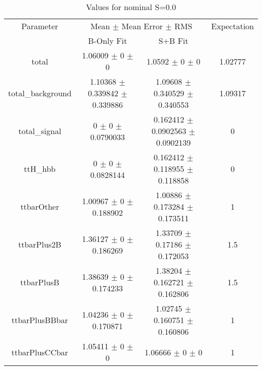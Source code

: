 \begin{table}
\centering
\caption{Values for nominal S=0.0}
\begin{tabular}{cccc}
\toprule
Parameter & \multicolumn{2}{c}{Mean $\pm$ Mean Error $\pm$ RMS} & Expectation\\
 & B-Only Fit & S+B Fit & \\
\midrule
total & \num{1.06009} $\pm$ \num{0} $\pm$ \num{0} & \num{1.0592} $\pm$ \num{0} $\pm$ \num{0} & \num{1.02777}\\
total\_background & \num{1.10368} $\pm$ \num{0.339842} $\pm$ \num{0.339886} & \num{1.09608} $\pm$ \num{0.340529} $\pm$ \num{0.340553} & \num{1.09317}\\
total\_signal & \num{0} $\pm$ \num{0} $\pm$ \num{0.0790033} & \num{0.162412} $\pm$ \num{0.0902563} $\pm$ \num{0.0902139} & \num{0}\\
ttH\_hbb & \num{0} $\pm$ \num{0} $\pm$ \num{0.0828144} & \num{0.162412} $\pm$ \num{0.118955} $\pm$ \num{0.118858} & \num{0}\\
ttbarOther & \num{1.00967} $\pm$ \num{0} $\pm$ \num{0.188902} & \num{1.00886} $\pm$ \num{0.173284} $\pm$ \num{0.173511} & \num{1}\\
ttbarPlus2B & \num{1.36127} $\pm$ \num{0} $\pm$ \num{0.186269} & \num{1.33709} $\pm$ \num{0.17186} $\pm$ \num{0.172053} & \num{1.5}\\
ttbarPlusB & \num{1.38639} $\pm$ \num{0} $\pm$ \num{0.174233} & \num{1.38204} $\pm$ \num{0.162721} $\pm$ \num{0.162806} & \num{1.5}\\
ttbarPlusBBbar & \num{1.04236} $\pm$ \num{0} $\pm$ \num{0.170871} & \num{1.02745} $\pm$ \num{0.160751} $\pm$ \num{0.160806} & \num{1}\\
ttbarPlusCCbar & \num{1.05411} $\pm$ \num{0} $\pm$ \num{0} & \num{1.06666} $\pm$ \num{0} $\pm$ \num{0} & \num{1}\\
\bottomrule
\end{tabular}
\end{table}
